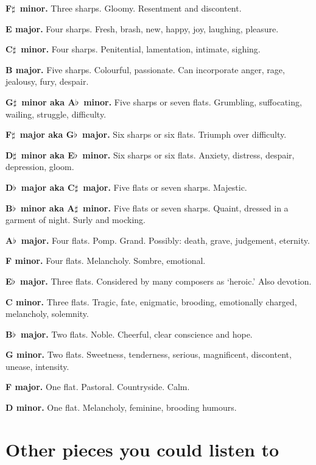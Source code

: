 \documentclass[a4paper]{article}
\newcommand\fl{$\flat$}
\newcommand\sh{$\sharp$}
\begin{document}
\noindent\textbf{F\sh\ minor.}  Three sharps.
Gloomy.
Resentment and discontent.

\noindent\textbf{E major.}  Four sharps.
Fresh, brash, new, happy, joy, laughing, pleasure.

\noindent\textbf{C\sh\ minor.}  Four sharps.
Penitential, lamentation, intimate, sighing.

\noindent\textbf{B major.}  Five sharps.
Colourful, passionate. Can incorporate anger, rage, jealousy, fury, despair.

\noindent\textbf{G\sh\ minor aka A\fl\ minor.}  Five sharps or seven flats.
Grumbling, suffocating, wailing, struggle, difficulty.

\noindent\textbf{F\sh\  major aka G\fl\ major.}  Six sharps or six flats.
Triumph over difficulty.

\noindent\textbf{D\sh\ minor aka E\fl\ minor.}  Six sharps or six flats.
Anxiety, distress,  despair,  depression, gloom.

\noindent\textbf{D\fl\ major aka C\sh\ major.}  Five flats or seven sharps.
Majestic.

\noindent\textbf{B\fl\ minor aka A\sh\ minor.}  Five flats or seven sharps.
Quaint, dressed in a garment of night. Surly and mocking.

\noindent\textbf{A\fl\ major.}  Four flats.
Pomp.  Grand. Possibly: death, grave, judgement, eternity.

\noindent\textbf{F minor.}  Four flats.
Melancholy. Sombre, emotional.

\noindent\textbf{E\fl\ major.}  Three flats.
Considered by many composers as `heroic.' Also devotion.

\noindent\textbf{C minor.}  Three flats.
Tragic, fate, enigmatic, brooding,
emotionally charged, melancholy, solemnity.

\noindent\textbf{B\fl\ major.}  Two flats.
Noble. Cheerful, clear conscience and hope.

\noindent\textbf{G minor.}  Two flats.
Sweetness, tenderness, serious, magnificent, discontent, unease, intensity.

\noindent\textbf{F major.}  One flat. 
Pastoral.  Countryside. Calm.

\noindent\textbf{D minor.}  One flat.
Melancholy, feminine, brooding humours.

\section{Other pieces you could listen to}
\end{document}

